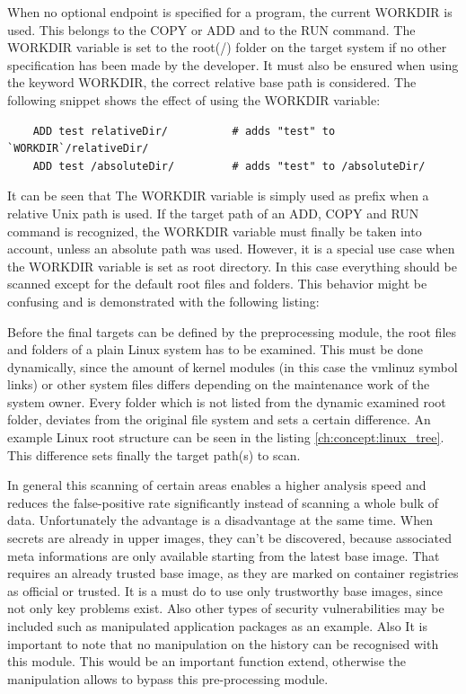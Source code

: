 When no optional endpoint is specified for a program, the current WORKDIR is used. This belongs to the COPY or ADD and to the RUN command.
The WORKDIR variable is set to the root(/) folder on the target system if no other specification has been made by the developer. 
It must also be ensured when using the keyword WORKDIR, the correct relative base path is considered. 
The following snippet shows the effect of using the WORKDIR variable:
\begin{lstlisting}
	ADD test relativeDir/          # adds "test" to `WORKDIR`/relativeDir/
	ADD test /absoluteDir/         # adds "test" to /absoluteDir/
\end{lstlisting}
It can be seen that The WORKDIR variable is simply used as prefix when a relative Unix path is used.
If the target path of an ADD, COPY and RUN command is recognized, the WORKDIR variable must finally be taken into account, unless an absolute path was used.
However, it is a special use case when the WORKDIR variable is set as root directory. In this case everything should be scanned except for the default root files and folders.
This behavior might be confusing and is demonstrated with the following listing:

Before the final targets can be defined by the preprocessing module, the root files and folders of a plain Linux system has to be examined. This must be done dynamically, since the amount of kernel modules (in this case the vmlinuz symbol links) or other system files differs depending on the maintenance work of the system owner. Every folder which is not listed from the dynamic examined root folder, deviates from the original file system and sets a certain difference. An example Linux root structure can be seen in the listing \ref{ch:concept:linux_tree}. This difference sets finally the target path(s) to scan. 

In general this scanning of certain areas enables a higher analysis speed and reduces the false-positive rate significantly instead of scanning a whole bulk of data. Unfortunately the advantage is a disadvantage at the same time. When secrets are already in upper images, they can't be discovered, because associated meta informations are only available starting from the latest base image. That requires an already trusted base image, as they are marked on container registries as official or trusted. It is a must do to use only trustworthy base images, since not only key problems exist. Also other types of security vulnerabilities may be included such as manipulated application packages as an example. 
Also It is important to note that no manipulation on the history can be recognised with this module. This would be an important function extend, otherwise the manipulation allows to bypass this pre-processing module. 

